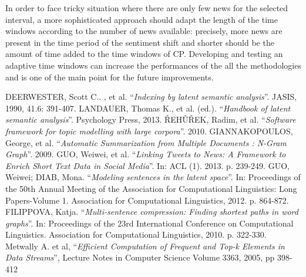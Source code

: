 \documentclass{acm_proc_article-sp-sigmod07}
\begin{document}
In order to face tricky situation where there are only few news for the selected interval, a more sophisticated approach should adapt the length of the time windows according to the number of news available:
precisely, more news are present in the time period of the sentiment shift and shorter should be the amount of time added to the time windows of CP.
Developing and testing an adaptive time windows can increase the performances of the all the methodologies and is one of the main point for the future improvements.

\begin{thebibliography}{9}
	DEERWESTER, Scott C.. , et al. ``\emph{Indexing by latent semantic analysis}''. JASIS, 1990, 41.6: 391-407.
	LANDAUER, Thomas K., et al. (ed.). ``\emph{Handbook of latent semantic analysis}''. Psychology Press, 2013.
	ŘEHŮŘEK, Radim, et al. ``\emph{Software framework for topic modelling with large corpora}''. 2010.
	GIANNAKOPOULOS, George, et al. ``\emph{Automatic Summarization from Multiple Documents : N-Gram Graph}''. 2009.
	GUO, Weiwei, et al. ``\emph{Linking Tweets to News: A Framework to Enrich Short Text Data in Social Media}''. In: ACL (1). 2013. p. 239-249.
	GUO, Weiwei; DIAB, Mona. ``\emph{Modeling sentences in the latent space}''. In: Proceedings of the 50th Annual Meeting of the Association for Computational Linguistics: Long Papers-Volume 1. Association for Computational Linguistics, 2012. p. 864-872.
	FILIPPOVA, Katja. ``\emph{Multi-sentence compression: Finding shortest paths in word graphs}''. In: Proceedings of the 23rd International Conference on Computational Linguistics. Association for Computational Linguistics, 2010. p. 322-330.
	Metwally A. et al, ``\emph{Efficient Computation of Frequent and Top-k
	Elements in Data Streams}'', Lecture Notes in Computer Science Volume 3363, 2005, pp 398-412

\end{thebibliography}
\end{document}
